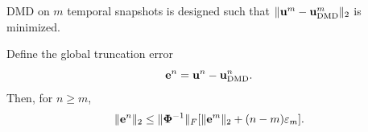 \documentclass[10pt,a4paper]{amsart}
\begin{document}
\begin{lemma}
\label{lemma:l3}
DMD on $m$ temporal snapshots is designed such that $\|\bold u^{m}-\bold u_\text{DMD}^{m}\|_2$ is minimized.
\end{lemma}

\begin{theorem}\label{thm:t3-7}
Define the global truncation error
\begin{equation}\label{eq:3-13}
\bold e^n = \bold u^n-\bold u_\mathrm{DMD}^n.
\end{equation}
Then, for $n\geq m$,
\begin{equation}\label{eq:3-14}
\|\bold e^n\|_2 \leq \|\boldsymbol\Phi^{-1}\|_F[\|\bold e^m\|_2+(n-m)\varepsilon_m].
\end{equation}
\end{theorem}
\end{document}
